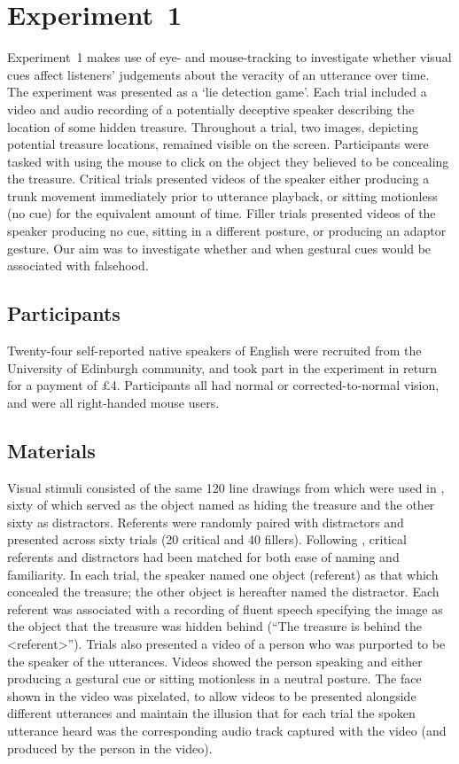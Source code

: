 \documentclass[a4paper,man,natbib]{apa6}
\begin{document}
\section{Experiment~1}
Experiment~1 makes use of eye- and mouse-tracking to investigate whether visual cues affect listeners' judgements about the veracity of an utterance over time. 
The experiment was presented as a `lie detection game'.
Each trial included a video and audio recording of a potentially deceptive speaker describing the location of some hidden treasure.
Throughout a trial, two images, depicting potential treasure locations, remained visible on the screen. 
Participants were tasked with using the mouse to click on the object they believed to be concealing the treasure.
Critical trials presented videos of the speaker either producing a trunk movement immediately prior to utterance playback, or sitting motionless (no cue) for the equivalent amount of time.
Filler trials presented videos of the speaker producing no cue, sitting in a different posture, or producing an adaptor gesture. 
Our aim was to investigate whether and when gestural cues would be associated with falsehood.

\subsection{Participants}
Twenty-four self-reported native speakers of English were recruited from the University of Edinburgh community, and took part in the experiment in return for a payment of \pounds{}4.
Participants all had normal or corrected-to-normal vision, and were all right-handed mouse users.

\subsection{Materials}
Visual stimuli consisted of the same 120 line drawings from \citet{Snodgrass1980} which were used in \citet{Loy2017}, sixty of which served as the object named as hiding the treasure and the other sixty as distractors.
Referents were randomly paired with distractors and presented across sixty trials (20 critical and 40 fillers). 
Following \citet{Loy2017}, critical referents and distractors had been matched for both ease of naming and familiarity.
In each trial, the speaker named one object (referent) as that which concealed the treasure; the other object is hereafter named the distractor.
Each referent was associated with a recording of fluent speech specifying the image as the object that the treasure was hidden behind (``The treasure is behind the <referent>'').
Trials also presented a video of a person who was purported to be the speaker of the utterances. 
Videos showed the person speaking and either producing a gestural cue or sitting motionless in a neutral posture.
The face shown in the video was pixelated, to allow videos to be presented alongside different utterances and maintain the illusion that for each trial the spoken utterance heard was the corresponding audio track captured with the video (and produced by the person in the video).
\end{document}
